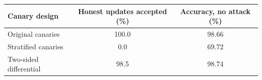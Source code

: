 \begin{tabular}{lcc}
\toprule
Canary design & Honest updates accepted (\%) & Accuracy, no attack (\%) \\
\midrule
Original canaries & 100.0 & 98.66 \\
Stratified canaries & 0.0 & 69.72 \\
Two-sided differential & 98.5 & 98.74 \\
\bottomrule
\end{tabular}
